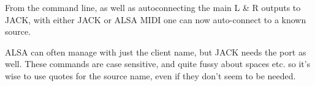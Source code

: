   From the command line, as well as autoconnecting the main L \& R outputs
   to JACK, with either JACK or ALSA MIDI one can now auto-connect to a
   known source.

   ALSA can often manage with just the client name, but JACK needs the port
   as well. These commands are case sensitive, and quite fussy about spaces
   etc. so it's wise to use quotes for the source name, even if they don't
   seem to be needed.

